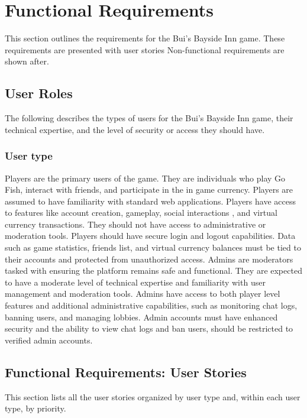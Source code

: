 \clearpage
\section{Functional Requirements}

This section outlines the requirements for the Bui’s Bayside Inn game. These requirements are presented with user stories Non-functional requirements are shown after.


\subsection{User Roles}

The following describes the types of users for the Bui’s Bayside Inn game, their technical expertise, and the level of security or access they should have. 



\subsubsection{User type}

Players are the primary users of the game. They are individuals who play Go Fish, interact with friends, and participate in the in game currency. Players are assumed to have familiarity with standard web applications. Players have access to features like account creation, gameplay, social interactions , and virtual currency transactions. They should not have access to administrative or moderation tools. Players should have secure login and logout capabilities. Data such as game statistics, friends list, and virtual currency balances must be tied to their accounts and protected from unauthorized access. Admins are moderators tasked with ensuring the platform remains safe and functional. They are expected to have a moderate level of technical expertise and familiarity with user management and moderation tools. Admins have access to both player level features and additional administrative capabilities, such as monitoring chat logs, banning users, and managing lobbies. Admin accounts must have enhanced security and the ability to view chat logs and ban users, should be restricted to verified admin accounts.

\subsection{Functional Requirements: User Stories}

This section lists all the user stories organized by user type and, within each user type, by priority.

